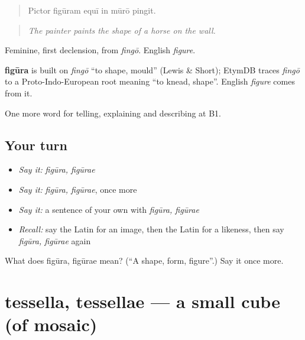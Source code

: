 \begin{quote}
Pictor figūram equī in mūrō pingit.
\end{quote}

\begin{quote}
\emph{The painter paints the shape of a horse on the wall.}
\end{quote}

Feminine, first declension, from \emph{fingō}. English \emph{figure}.

\begin{cousinweb}
\textbf{figūra} is built on \emph{fingō} \textquotedblleft{}to shape, mould\textquotedblright{} (Lewis \& Short); EtymDB traces \emph{fingō} to a Proto-Indo-European root meaning \textquotedblleft{}to knead, shape\textquotedblright{}. English \emph{figure} comes from it.
\end{cousinweb}

\begin{grammarlens}[title={What you've built}]
One more word for telling, explaining and describing at B1.
\end{grammarlens}

\subsection*{Your turn}
\begin{itemize}
\raggedright
  \item \emph{Say it:} \emph{figūra, figūrae}
  \item \emph{Say it:} \emph{figūra, figūrae}, once more
  \item \emph{Say it:} a sentence of your own with \emph{figūra, figūrae}
  \item \emph{Recall:} say the Latin for an image, then the Latin for a likeness, then say \emph{figūra, figūrae} again
\end{itemize}

\begin{tcolorbox}[breakable,colback=teal!4,colframe=teal!35!black,title={Before you move on}]
What does figūra, figūrae mean? (\textquotedblleft{}A shape, form, figure\textquotedblright{}.) Say it once more.
\end{tcolorbox}
\section[tessella, tessellae]{tessella, tessellae — a small cube (of mosaic)}

\label{lesson:LA-C547-tessella}



